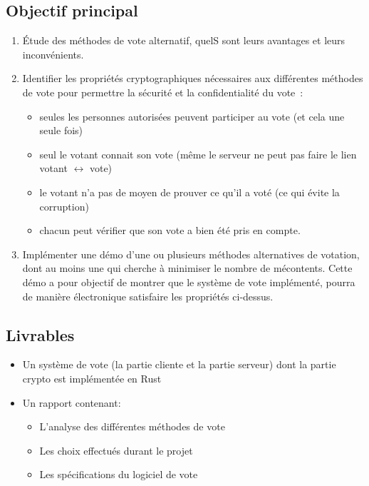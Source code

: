 \documentclass[../report]{subfiles}
\begin{document}
\subsection{Objectif principal}\label{ssec:cdc:cdc:objprinc}
\begin{enumerate}
  \item Étude des méthodes de vote alternatif, quelS sont leurs avantages et leurs inconvénients.
  \item Identifier les propriétés cryptographiques nécessaires aux différentes méthodes de vote pour permettre la sécurité et la confidentialité du vote~:
    \begin{itemize}
      \item seules les personnes autorisées peuvent participer au vote (et cela une seule fois)
      \item seul le votant connait son vote (même le serveur ne peut pas faire le lien votant $\longleftrightarrow$ vote)
      \item le votant n'a pas de moyen de prouver ce qu'il a voté (ce qui évite la corruption)
      \item chacun peut vérifier que son vote a bien été pris en compte.
    \end{itemize}
  \item Implémenter une démo d'une ou plusieurs méthodes alternatives de votation, dont au moins une qui cherche à minimiser le nombre de mécontents. Cette démo a pour objectif de montrer que le système de vote implémenté, pourra de manière électronique satisfaire les propriétés ci-dessus.
\end{enumerate}

\subsection{Livrables}
    \begin{itemize}
      \item Un système de vote (la partie cliente et la partie serveur) dont la partie crypto est implémentée en Rust
      \item Un rapport contenant: 
      \begin{itemize}
        \item L'analyse des différentes méthodes de vote
        \item Les choix effectués durant le projet
        \item Les spécifications du logiciel de vote
      \end{itemize}
    \end{itemize}
\end{document}
